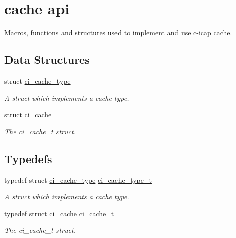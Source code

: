 \hypertarget{group__CACHE}{
\section{cache api}
\label{group__CACHE}
}


Macros, functions and structures used to implement and use c-\/icap cache.  
\subsection*{Data Structures}
\begin{DoxyCompactItemize}
\item 
struct \hyperlink{structci__cache__type}{ci\_\-cache\_\-type}
\begin{DoxyCompactList}\small\item\em A struct which implements a cache type. \item\end{DoxyCompactList}\item 
struct \hyperlink{structci__cache}{ci\_\-cache}
\begin{DoxyCompactList}\small\item\em The ci\_\-cache\_\-t struct. \item\end{DoxyCompactList}\end{DoxyCompactItemize}
\subsection*{Typedefs}
\begin{DoxyCompactItemize}
\item 
typedef struct \hyperlink{structci__cache__type}{ci\_\-cache\_\-type} \hyperlink{group__CACHE_ga2547be1d5fdb02626e6f63a419bac6bd}{ci\_\-cache\_\-type\_\-t}
\begin{DoxyCompactList}\small\item\em A struct which implements a cache type. \item\end{DoxyCompactList}\item 
\hypertarget{group__CACHE_ga35209cf859994cb24ffd32932974b750}{
typedef struct \hyperlink{structci__cache}{ci\_\-cache} \hyperlink{group__CACHE_ga35209cf859994cb24ffd32932974b750}{ci\_\-cache\_\-t}}
\label{group__CACHE_ga35209cf859994cb24ffd32932974b750}

\begin{DoxyCompactList}\small\item\em The ci\_\-cache\_\-t struct. \item\end{DoxyCompactList}\end{DoxyCompactItemize}
